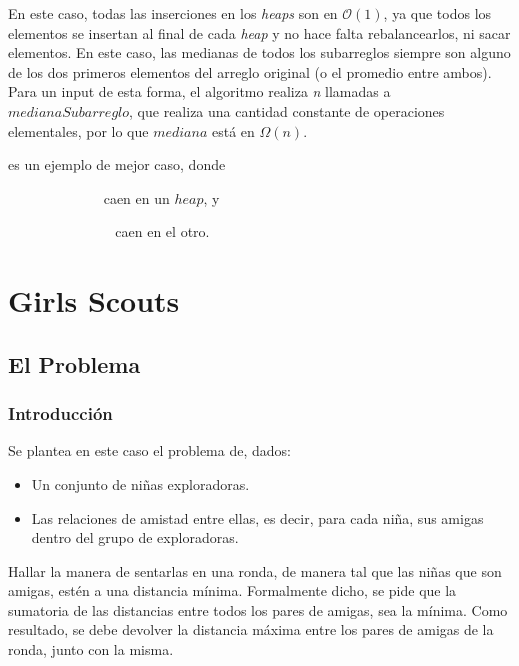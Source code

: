 \documentclass[spanish,a4paper]{article}
\begin{document}
En este caso, todas las inserciones en los \textit{heaps} son en $\mathcal{O}(1)$, ya que todos los elementos se insertan al final de cada \textit{heap} y no hace falta rebalancearlos, ni sacar elementos. En este caso, las medianas de todos los subarreglos siempre son alguno de los dos primeros elementos del arreglo original (o el promedio entre ambos). Para un input de esta forma, el algoritmo realiza \textit{n} llamadas a $medianaSubarreglo$, que realiza una cantidad constante de operaciones elementales, por lo que $mediana$ está en $\Omega(n)$.

 es un ejemplo de mejor caso, donde

 \ \ \ \ \ \ \ \ \ \ \ \ \  caen en un $heap$, y

\ \ \ \  \ \ \ \ \ \ \ \ \ \  caen en el otro.



\newpage





\section{Girls Scouts}

\subsection{El Problema}
 \subsubsection{Introducción}
Se plantea en este caso el problema de, dados:
\begin{itemize}

\item Un conjunto de niñas exploradoras.

\item Las relaciones de amistad entre ellas, es decir, para cada niña, sus amigas dentro del grupo de exploradoras.
\end{itemize}

Hallar la manera de sentarlas en una ronda, de manera tal que las niñas que son amigas, estén a una distancia mínima. Formalmente dicho, se pide que la sumatoria de las distancias entre todos los pares de amigas, sea la mínima. Como resultado, se debe devolver la distancia máxima entre los pares de amigas de la ronda, junto con la misma. 
\end{document}
